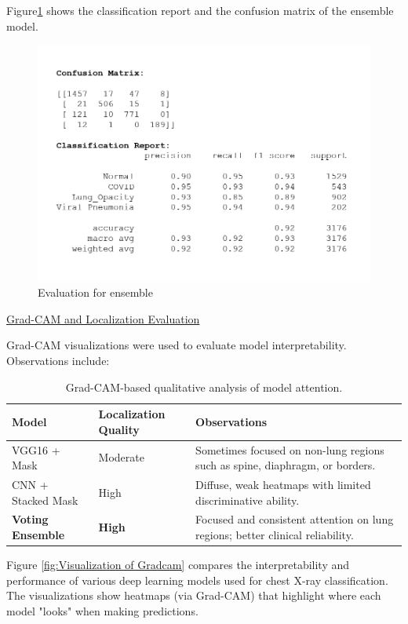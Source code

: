 \documentclass{article}
\begin{document}
Figure\ref{fig: Confusion matrix for ensemble} shows the classification report and the confusion matrix of the ensemble model.

\begin{figure}%
    \centering
    \includegraphics[width=0.5\linewidth]{cm_cr_ensemble.png}
    \caption{Evaluation for ensemble}
    \label{fig: Confusion matrix for ensemble}
\end{figure}


\underline{Grad-CAM and Localization Evaluation}

Grad-CAM visualizations were used to evaluate model interpretability. Observations include:

\begin{table}[H]
\centering
\begin{tabular}{|l|l|p{8cm}|}
\hline
\textbf{Model} & \textbf{Localization Quality} & \textbf{Observations} \\
\hline
VGG16 + Mask & Moderate  & Sometimes focused on non-lung regions such as spine, diaphragm, or borders. \\
\hline
CNN + Stacked Mask & High  & Diffuse, weak heatmaps with limited discriminative ability. \\
\hline
\textbf{Voting Ensemble} & \textbf{High} & Focused and consistent attention on lung regions; better clinical reliability. \\
\hline
\end{tabular}
\caption{Grad-CAM-based qualitative analysis of model attention.}
\end{table}


Figure \ref{fig:Visualization of Gradcam} compares the interpretability and performance of various deep learning models used for chest X-ray classification. The visualizations show heatmaps (via Grad-CAM) that highlight where each model "looks" when making predictions.
\end{document}
